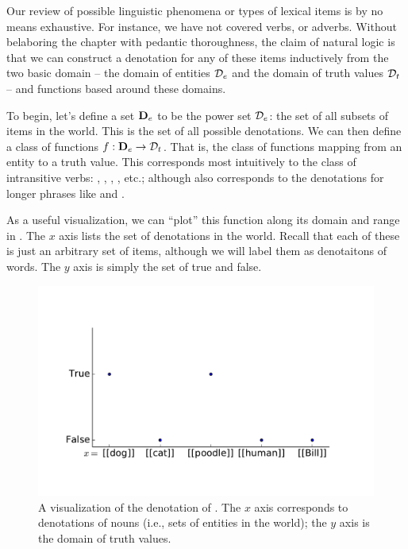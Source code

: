 Our review of possible linguistic phenomena or types of lexical items is by 
  no means exhaustive.
For instance, we have not covered verbs, or adverbs.
Without belaboring the chapter with pedantic thoroughness, the claim of natural logic
  is that we can construct a denotation for any of these items inductively
  from the two basic domain -- 
  the domain of entities $\mathcal{D}_e$ and the domain of truth values $\mathcal{D}_t$ --
  and functions based around these domains.

To begin, let's define a set $\mathbf{D}_e$ to be the power set $\mathcal{D}_e$: the set of all subsets
  of items in the world.
This is the set of all possible denotations.
We can then define a class of functions $f : \mathbf{D}_e \rightarrow \mathcal{D}_t$.
That is, the class of functions mapping from an entity to a truth value.
This corresponds most intuitively to the class of intransitive verbs: ,
  , , , etc.;
  although also corresponds to the denotations for longer phrases like 
  and .

As a useful visualization, we can ``plot'' this function
  along its domain and range in  .
The $x$ axis lists the set of denotations in the world.
Recall that each of these is just an arbitrary set of items, 
  although we will label them as denotaitons of words.
The $y$ axis is simply the set of true and false.

\begin{figure}[h]
\begin{center}
\includegraphics[height=7cm]{img/denotations_barks.pdf}
\end{center}
\caption{\label{fig:natlog-denotation-barks}
  A visualization of the denotation of . The $x$ axis corresponds to denotations
  of nouns (i.e., sets of entities in the world); the $y$ axis is the domain of truth values.
}
\end{figure}

